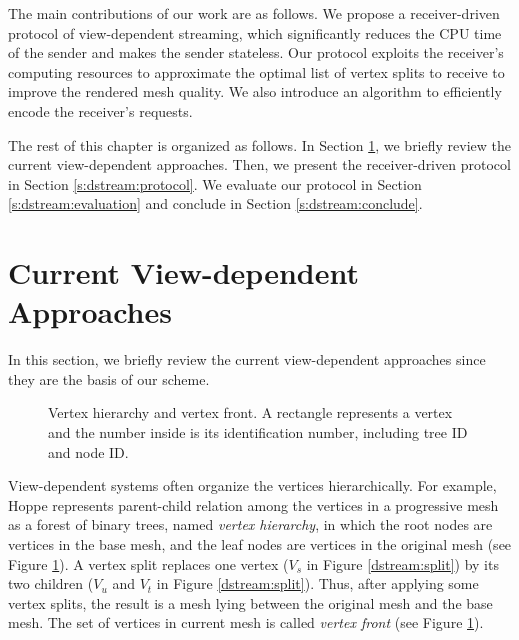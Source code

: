     The main contributions of our work are as follows.  We
    propose a receiver-driven protocol of view-dependent streaming, which
    significantly reduces the CPU time of the sender
    and makes the sender stateless.  Our protocol exploits the receiver's 
    computing resources to approximate the optimal list of vertex splits to receive
    to improve the rendered mesh quality.  We also introduce an 
    algorithm to efficiently encode the receiver's requests.
    

    The rest of this chapter is organized as follows.
    In Section \ref{s:dstream:terms}, we briefly review the current view-dependent approaches.
    Then, we present the receiver-driven protocol 
    in Section \ref{s:dstream:protocol}.
    We evaluate our protocol in Section \ref{s:dstream:evaluation} 
    and conclude in Section \ref{s:dstream:conclude}.

\section{Current View-dependent Approaches}
\label{s:dstream:terms}
    In this section, we briefly review the current view-dependent approaches since 
    they are the basis of our scheme.
   
    \begin{figure}
    \centering
    \caption{Vertex hierarchy and vertex front. A rectangle represents a vertex and the number inside
    is its identification number, including tree ID and node ID.\label{dstream:hierarchy}}
    \end{figure}
    View-dependent systems often organize the vertices hierarchically.
    For example, Hoppe \cite{258843} represents
    parent-child relation among the vertices in a progressive mesh
    as a forest of binary trees, named \emph{vertex hierarchy},
    in which the root nodes are vertices in the base mesh, and
    the leaf nodes are vertices in the original mesh (see Figure \ref{dstream:hierarchy}).
    A vertex split replaces one vertex ($V_s$ in Figure \ref{dstream:split})
    by its two children ($V_u$ and $V_t$ in Figure \ref{dstream:split}).
    Thus, after applying some vertex splits,
    the result is a mesh lying between the original mesh and the base mesh.
    The set of vertices in current mesh is called \emph{vertex front}
    \cite{258843}
    (see Figure \ref{dstream:hierarchy}).%
    
